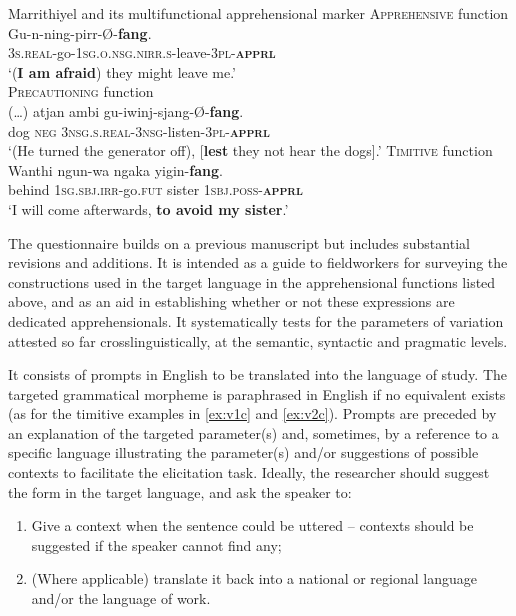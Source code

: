 \documentclass[output=paper,colorlinks,citecolor=brown]{langscibook}
\begin{document}
\ea \label{ex:v2} \textnormal{Marrithiyel and its multifunctional apprehensional marker \citep[80, 166, 58, MV's emphasis]{green1989}}
\ea \label{ex:v2a} \textnormal{\textsc{Apprehensive} function} \\
\gll Gu-n-ning-pirr-Ø-\textbf{fang}. \\
\textsc{3s.real}-go-\textsc{1sg.o.nsg.nirr.s}-leave-\textsc{3pl-\textbf{apprl}} \\
\glt `({\textbf{I am afraid}}) they might leave me.' \\
\ex \label{ex:v2b} \textnormal{\textsc{Precautioning} function }\\
\gll \textnormal{(\ldots)} {\ob}atjan ambi gu-iwinj-sjang-Ø-\textbf{fang}{\cb}.\\
{} dog \textsc{neg} \textsc{3nsg.s.real-3nsg-}listen-\textsc{3pl-\textbf{apprl}} \\
\glt `(He turned the generator off), [\textbf{lest} they not hear the dogs].'
\ex \label{ex:v2c} \textnormal{\textsc{Timitive} function }\\
\gll Wanthi ngun-wa ngaka yigin-\textbf{fang}. \\
behind \textsc{1sg.sbj.irr}-go\textsc{.fut} sister \textsc{1sbj.poss-\textbf{apprl}} \\
\glt `I will come afterwards, \textbf{to avoid my sister}.'
\z
\z

The questionnaire builds on a previous manuscript \citep{VuillermetM2018questionnaire} but includes substantial revisions and additions.  It is intended as a guide to fieldworkers for surveying the constructions used in the target language in the apprehensional functions listed above, and as an aid in establishing whether or not these expressions are dedicated apprehensionals. It  systematically tests for the parameters of variation attested so far crosslinguistically, at the semantic, syntactic and pragmatic levels.

It consists of prompts in English to be translated into the language of study. The targeted grammatical morpheme is paraphrased in English if no equivalent exists (as for the timitive examples in \ref{ex:v1c} and \ref{ex:v2c}). Prompts are preceded by an explanation of the targeted parameter(s) and, sometimes, by a reference to a specific language illustrating the parameter(s) and/or suggestions of possible contexts to facilitate the elicitation task. Ideally, the researcher should suggest the form in the target language, and ask the speaker to:

\begin{enumerate}
    \item Give a context when the sentence could be uttered -- contexts should be suggested if the speaker cannot find any;
    \item (Where applicable) translate it back into a national or regional language and/or the language of work.
    
\end{enumerate}
\end{document}
